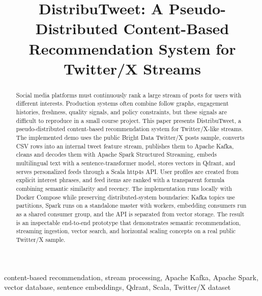 \documentclass[conference]{IEEEtran}
\begin{document}
\title{DistribuTweet: A Pseudo-Distributed Content-Based Recommendation System for Twitter/X Streams}

\author{
\and
{}
}

\maketitle

\begin{abstract}
Social media platforms must continuously rank a large stream of posts for users with different interests. Production systems often combine follow graphs, engagement histories, freshness, quality signals, and policy constraints, but these signals are difficult to reproduce in a small course project. This paper presents DistribuTweet, a pseudo-distributed content-based recommendation system for Twitter/X-like streams. The implemented demo uses the public Bright Data Twitter/X posts sample, converts CSV rows into an internal tweet feature stream, publishes them to Apache Kafka, cleans and decodes them with Apache Spark Structured Streaming, embeds multilingual text with a sentence-transformer model, stores vectors in Qdrant, and serves personalized feeds through a Scala http4s API. User profiles are created from explicit interest phrases, and feed items are ranked with a transparent formula combining semantic similarity and recency. The implementation runs locally with Docker Compose while preserving distributed-system boundaries: Kafka topics use partitions, Spark runs on a standalone master with workers, embedding consumers run as a shared consumer group, and the API is separated from vector storage. The result is an inspectable end-to-end prototype that demonstrates semantic recommendation, streaming ingestion, vector search, and horizontal scaling concepts on a real public Twitter/X sample.
\end{abstract}

\begin{IEEEkeywords}
content-based recommendation, stream processing, Apache Kafka, Apache Spark, vector database, sentence embeddings, Qdrant, Scala, Twitter/X dataset
\end{IEEEkeywords}
\end{document}
